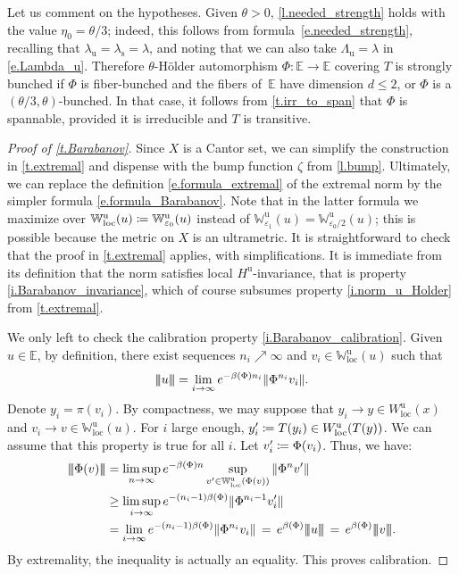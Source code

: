 \documentclass[JEP,XML,SOM,Unicode]{cedram}
\def\vcentcolon{\mathrel{\mathop\ordinarycolon}}
\providecommand\ordinarycolon{:}
\providecommand*\coloneqq{\vcentcolon\mathrel{\mkern-1.2mu}=}
\theoremstyle{plain}
\theoremstyle{definition}
\newcommand{\tribar}[1]{\mathopen{| {\kern -1.5pt} | {\kern -1.5pt} |} {#1}
\mathclose{| {\kern -1.5pt} | {\kern -1.5pt} |}}
\newcommand{\EE}{\mathbb{E}}
\newcommand{\WW}{\mathbb{W}}
\newcommand{\uu}{\mathrm{u}}
\renewcommand{\ss}{\mathrm{s}}
\let\epsilon\varepsilon
\begin{document}
Let us comment on the hypotheses.
Given $\theta>0$, \cref{l.needed_strength} holds with the value $\eta_0 = \theta/3$; indeed, this follows from formula~\eqref{e.needed_strength}, recalling that $\lambda_\uu = \lambda_\ss = \lambda$, and noting that we can also take $\Lambda_\uu = \lambda$ in \eqref{e.Lambda_u}.
Therefore $\theta$-Hölder automorphism $\Phi \colon \EE \to \EE$ covering $T$ is strongly bunched
if $\Phi$ is fiber-bunched and the fibers of~$\EE$ have dimension $d \le 2$, or $\Phi$ is a $(\theta/3,\theta)$-bunched.
In that case, it follows from \cref{t.irr_to_span} that $\Phi$ is spannable, provided it is irreducible and $T$ is transitive.

\begin{proof}[Proof of \cref{t.Barabanov}]
Since $X$ is a Cantor set, we can simplify the construction in \cref{t.extremal} and dispense with the bump function $\zeta$ from \cref{l.bump}. Ultimately, we can replace the definition \eqref{e.formula_extremal} of the extremal norm by the simpler formula \eqref{e.formula_Barabanov}.
Note that in the latter formula we maximize over $\WW^{\uu}_{\mathrm{loc}}(u) \coloneqq \WW^\uu_{\epsilon_0}(u)$ instead of $\WW^\uu_{\epsilon_1}(u) = \WW^\uu_{\epsilon_0/2}(u)$; this is possible because the metric on $X$ is an ultrametric.
It is straightforward to check that the proof in \cref{t.extremal} applies, with simplifications.
It is immediate from its definition that the norm satisfies local $H^{\uu}$-invariance, that is property \eqref{i.Barabanov_invariance}, which of course subsumes property \eqref{i.norm_u_Holder} from \cref{t.extremal}.
		
We only left to check the calibration property \eqref{i.Barabanov_calibration}.
Given $ u \in \EE$, by definition, there exist sequences $n_i \nearrow \infty$ and $ v_i \in \WW^{\uu}_\mathrm{loc}(u) $
such that
\[
\tribar{u} = \lim_{i\to\infty} e^{-\beta(\Phi) n_i} \| \Phi^{n_i}v_i \|.
\]
Denote $ y_i = \pi(v_i) $. By compactness, we may suppose that $ y_i \to y \in W^{\uu}_{\mathrm{loc}}(x) $ and $ v_i \to v \in \WW^{\uu}_\mathrm{loc}(u) $.
For $ i $ large enough, $y'_i \coloneqq T(y_i) \in W^{\uu}_{\mathrm{loc}}(T(y))$. We can assume that this property is true for all $i$.
Let $ v'_i \coloneqq \Phi(v_i) $. Thus, we have:
\begin{align*}
\tribar{\Phi(v)}
&= \limsup_{n\to \infty} e^{- \beta(\Phi) n} \sup_{v' \in \WW^{\uu}_{\mathrm{loc}}(\Phi(v))} \| \Phi^n v' \| \\
&\ge \limsup_{i \to \infty} e^{-(n_i-1) \beta(\Phi) } \| \Phi^{n_i-1}v'_i \| \\
&= \lim_{i \to \infty} e^{-(n_i-1) \beta(\Phi) } \| \Phi^{n_i}v_i \| \, = \, e^{\beta(\Phi)} \tribar{u} \, = \, e^{\beta(\Phi)} \tribar{v}.
\end{align*}
By extremality, the inequality is actually an equality.
This proves calibration.
\end{proof}
\end{document}

